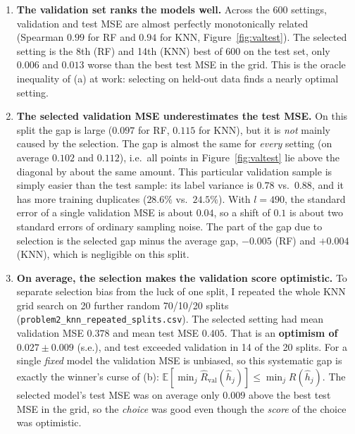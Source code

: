 \documentclass[11pt]{article}
\newcommand{\E}{\mathbb{E}}
\begin{document}
\begin{enumerate}
\item \textbf{The validation set ranks the models well.} Across the 600 settings, validation and
test MSE are almost perfectly monotonically related (Spearman $0.99$ for RF and $0.94$ for KNN,
Figure~\ref{fig:valtest}). The selected setting is the 8th (RF) and 14th (KNN) best of 600 on the
test set, only $0.006$ and $0.013$ worse than the best test MSE in the grid. This is the oracle
inequality of (a) at work: selecting on held-out data finds a nearly optimal setting.

\item \textbf{The selected validation MSE underestimates the test MSE.} On this split the gap is
large ($0.097$ for RF, $0.115$ for KNN), but it is \emph{not} mainly caused by the selection. The
gap is almost the same for \emph{every} setting (on average $0.102$ and $0.112$), i.e.\ all points
in Figure~\ref{fig:valtest} lie above the diagonal by about the same amount. This particular
validation sample is simply easier than the test sample: its label variance is $0.78$ vs.\ $0.88$,
and it has more training duplicates ($28.6\%$ vs.\ $24.5\%$). With $l=490$, the standard error of a
single validation MSE is about $0.04$, so a shift of $0.1$ is about two standard errors of ordinary
sampling noise. The part of the gap due to selection is the selected gap minus the average gap,
$-0.005$ (RF) and $+0.004$ (KNN), which is negligible on this split.

\item \textbf{On average, the selection makes the validation score optimistic.} To separate
selection bias from the luck of one split, I repeated the whole KNN grid search on 20 further random
70/10/20 splits (\texttt{problem2\_knn\_repeated\_splits.csv}). The selected setting had mean
validation MSE $0.378$ and mean test MSE $0.405$. That is an \textbf{optimism of $0.027\pm0.009$}
(s.e.), and test exceeded validation in 14 of the 20 splits. For a single \emph{fixed} model the
validation MSE is unbiased, so this systematic gap is exactly the winner's curse of (b):
$\E[\min_j\widehat R_{\text{val}}(\hat h_j)]\le\min_jR(\hat h_j)$. The selected model's test MSE
was on average only $0.009$ above the best test MSE in the grid, so the \emph{choice} was good even
though the \emph{score} of the choice was optimistic.


\end{enumerate}
\end{document}

